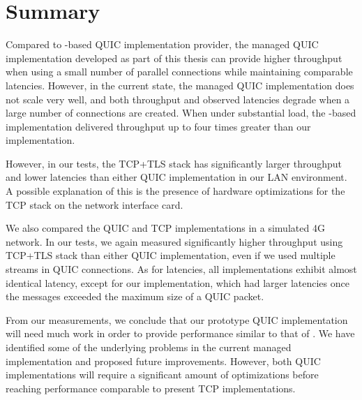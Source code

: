 \section{Summary}

Compared to \libmsquic{}-based QUIC implementation provider, the managed QUIC implementation
developed as part of this thesis can provide higher throughput when using a small number of parallel
connections while maintaining comparable latencies. However, in the current state, the managed QUIC
implementation does not scale very well, and both throughput and observed latencies degrade when a
large number of connections are created. When under substantial load, the \libmsquic{}-based
implementation delivered throughput up to four times greater than our implementation.

However, in our tests, the TCP+TLS stack has significantly larger throughput and lower latencies
than either QUIC implementation in our LAN environment. A possible explanation of this is the
presence of hardware optimizations for the TCP stack on the network interface card.

We also compared the QUIC and TCP implementations in a simulated 4G network. In our tests, we again
measured significantly higher throughput using TCP+TLS stack than either QUIC implementation, even
if we used multiple streams in QUIC connections. As for latencies, all implementations exhibit
almost identical latency, except for our implementation, which had larger latencies once the
messages exceeded the maximum size of a QUIC packet.

From our measurements, we conclude that our prototype QUIC implementation will need much work in
order to provide performance similar to that of \libmsquic{}. We have identified some of the
underlying problems in the current managed implementation and proposed future improvements. However,
both QUIC implementations will require a significant amount of optimizations before reaching
performance comparable to present TCP implementations.
